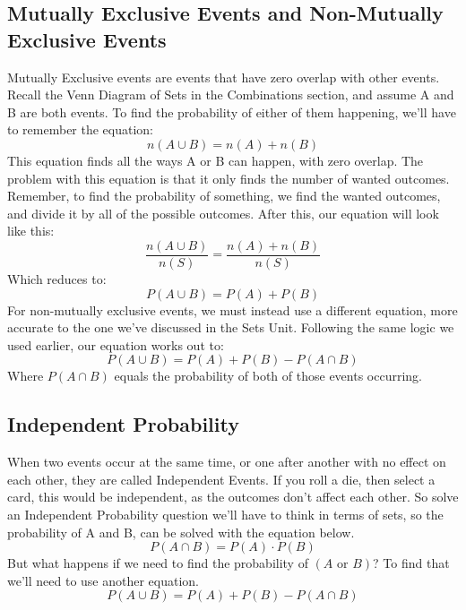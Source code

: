 \documentclass[final,1p,12pt]{elsarticle}
\begin{document}
    \subsection{Mutually Exclusive Events and Non-Mutually Exclusive Events}
    Mutually Exclusive events are events that have zero overlap with other events.
    Recall the Venn Diagram of Sets in the Combinations section, and assume A and B are both events.
    To find the probability of either of them happening, we'll have to remember the equation:
    \begin{equation*}
        n(A\cup B) = n(A) + n(B)
    \end{equation*}
    This equation finds all the ways A or B can happen, with zero overlap.
    The problem with this equation is that it only finds the number of wanted outcomes.
    Remember, to find the probability of something, we find the wanted outcomes, and divide it by all of the possible outcomes.
    After this, our equation will look like this:
    \begin{equation*}
        \frac{n(A \cup B)}{n(S)} = \frac{n(A) + n(B)}{n(S)}
    \end{equation*}
    Which reduces to:
    \begin{equation*}
        P(A\cup B) = P(A) + P(B)
    \end{equation*}
    For non-mutually exclusive events, we must instead use a different equation, more accurate to the one we've discussed in the Sets Unit.
    Following the same logic we used earlier, our equation works out to:
    \begin{equation*}
        P(A\cup B) = P(A) + P(B) - P(A\cap B)
    \end{equation*}
    Where $P(A\cap B)$ equals the probability of both of those events occurring.

    \subsection{Independent Probability}
    When two events occur at the same time, or one after another with no effect on each other, they are called Independent Events.
    If you roll a die, then select a card, this would be independent, as the outcomes don't affect each other.
    So solve an Independent Probability question we'll have to think in terms of sets, so the probability of A and B, can be solved with the equation below.
    \begin{equation*}
        P(A\cap B) = P(A)\cdot P(B)
    \end{equation*}
        But what happens if we need to find the probability of $(A \mbox{ or } B)$?
        To find that we'll need to use another equation.
    \begin{equation*}
        P(A\cup B) = P(A) + P(B) - P(A\cap B)
    \end{equation*}
    
\end{document}
